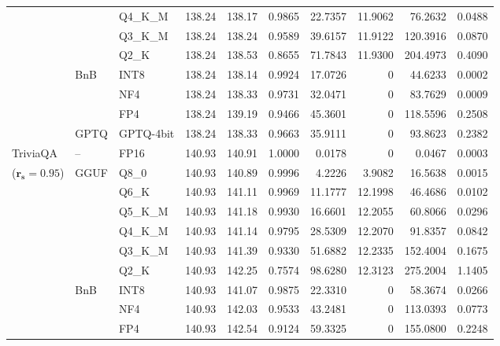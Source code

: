\begin{longtable}{ll l rrrrrrr}
 &  & Q4\_K\_M & 138.24 & 138.17 & 0.9865 & 22.7357 & 11.9062 & 76.2632 & 0.0488 \\
 &  & Q3\_K\_M & 138.24 & 138.24 & 0.9589 & 39.6157 & 11.9122 & 120.3916 & 0.0870 \\
 &  & Q2\_K & 138.24 & 138.53 & \cellcolor{red!18} 0.8655 & \cellcolor{red!18} 71.7843 & 11.9300 & \cellcolor{red!18} 204.4973 & \cellcolor{red!18} 0.4090 \\
 & BnB & INT8 & 138.24 & 138.14 & 0.9924 & 17.0726 & \cellcolor{cyan!12} $0$ & 44.6233 & 0.0002 \\
 &  & NF4 & 138.24 & 138.33 & 0.9731 & 32.0471 & \cellcolor{cyan!12} $0$ & 83.7629 & 0.0009 \\
 &  & FP4 & 138.24 & 139.19 & \cellcolor{red!18} 0.9466 & \cellcolor{red!18} 45.3601 & \cellcolor{cyan!12} $0$ & \cellcolor{red!18} 118.5596 & \cellcolor{red!18} 0.2508 \\
 & GPTQ & GPTQ-4bit & 138.24 & 138.33 & 0.9663 & 35.9111 & \cellcolor{cyan!12} $0$ & 93.8623 & 0.2382 \\
\midrule
TriviaQA & -- & FP16 & 140.93 & 140.91 & 1.0000 & 0.0178 & \cellcolor{cyan!12} $0$ & 0.0467 & 0.0003 \\
{\small ($\mathbf{r_s{=}0.95}$)} & GGUF & Q8\_0 & 140.93 & 140.89 & 0.9996 & 4.2226 & 3.9082 & 16.5638 & 0.0015 \\
 &  & Q6\_K & 140.93 & 141.11 & 0.9969 & 11.1777 & 12.1998 & 46.4686 & 0.0102 \\
 &  & Q5\_K\_M & 140.93 & 141.18 & 0.9930 & 16.6601 & 12.2055 & 60.8066 & 0.0296 \\
 &  & Q4\_K\_M & 140.93 & 141.14 & 0.9795 & 28.5309 & 12.2070 & 91.8357 & 0.0842 \\
 &  & Q3\_K\_M & 140.93 & 141.39 & \cellcolor{red!18} 0.9330 & \cellcolor{red!18} 51.6882 & 12.2335 & \cellcolor{red!18} 152.4004 & \cellcolor{red!18} 0.1675 \\
 &  & Q2\_K & 140.93 & 142.25 & \cellcolor{red!35} 0.7574 & \cellcolor{red!35} 98.6280 & 12.3123 & \cellcolor{red!35} 275.2004 & \cellcolor{red!35} 1.1405 \\
 & BnB & INT8 & 140.93 & 141.07 & 0.9875 & 22.3310 & \cellcolor{cyan!12} $0$ & 58.3674 & 0.0266 \\
 &  & NF4 & 140.93 & 142.03 & 0.9533 & 43.2481 & \cellcolor{cyan!12} $0$ & 113.0393 & 0.0773 \\
 &  & FP4 & 140.93 & 142.54 & \cellcolor{red!18} 0.9124 & \cellcolor{red!18} 59.3325 & \cellcolor{cyan!12} $0$ & \cellcolor{red!18} 155.0800 & \cellcolor{red!18} 0.2248 \\

\end{longtable}
